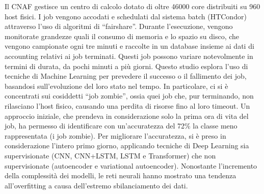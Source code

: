 Il CNAF gestisce un centro di calcolo dotato di oltre 46000 core distribuiti
su 960 host fisici. I job vengono accodati e schedulati dal sistema batch
(HTCondor) attraverso l'uso di algoritmi di ``fairshare''.
Durante l'esecuzione, vengono monitorate grandezze quali il consumo di memoria
e lo spazio su disco, che vengono campionate ogni tre minuti e raccolte in un
database insieme ai dati di accounting relativi ai job terminati.
Questi job possono variare notevolmente in termini di durata, da pochi minuti
a più giorni.
Questo studio esplora l'uso di tecniche di Machine Learning per prevedere il
successo o il fallimento dei job, basandosi sull'evoluzione del loro stato nel
tempo.
In particolare, ci si è concentrati sui cosiddetti ``job zombie'', ossia quei
job che, pur terminando, non rilasciano l'host fisico, causando una perdita di
risorse fino al loro timeout.
Un approccio iniziale, che prendeva in considerazione solo la prima ora di
vita del job, ha permesso di identificare con un'accuratezza del 72\% la
classe meno rappresentata (i job zombie).
Per migliorare l'accuratezza, si è preso in considerazione l'intero primo
giorno, applicando tecniche di Deep Learning sia supervisionate (CNN,
CNN+LSTM, LSTM e Transformer) che non supervisionate (autoencoder e
variational autoencoder). 
Nonostante l'incremento della complessità dei modelli, le reti neurali hanno
mostrato una tendenza all'overfitting a causa dell'estremo sbilanciamento dei
dati.
